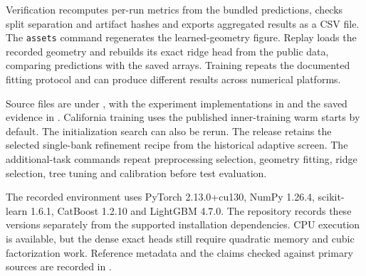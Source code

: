 \documentclass[11pt]{article}
\begin{document}
Verification recomputes per-run metrics from the bundled predictions, checks split separation and artifact hashes and exports aggregated results as a CSV file. The \texttt{assets} command regenerates the learned-geometry figure. Replay loads the recorded geometry and rebuilds its exact ridge head from the public data, comparing predictions with the saved arrays. Training repeats the documented fitting protocol and can produce different results across numerical platforms.

Source files are under , with the experiment implementations in  and the saved evidence in . California training uses the published inner-training warm starts by default. The initialization search can also be rerun. The release retains the selected single-bank refinement recipe from the historical adaptive screen. The additional-task commands repeat preprocessing selection, geometry fitting, ridge selection, tree tuning and calibration before test evaluation.

The recorded environment uses PyTorch 2.13.0+cu130, NumPy 1.26.4, scikit-learn 1.6.1, CatBoost 1.2.10 and LightGBM 4.7.0. The repository records these versions separately from the supported installation dependencies. CPU execution is available, but the dense exact heads still require quadratic memory and cubic factorization work. Reference metadata and the claims checked against primary sources are recorded in .



\end{document}
